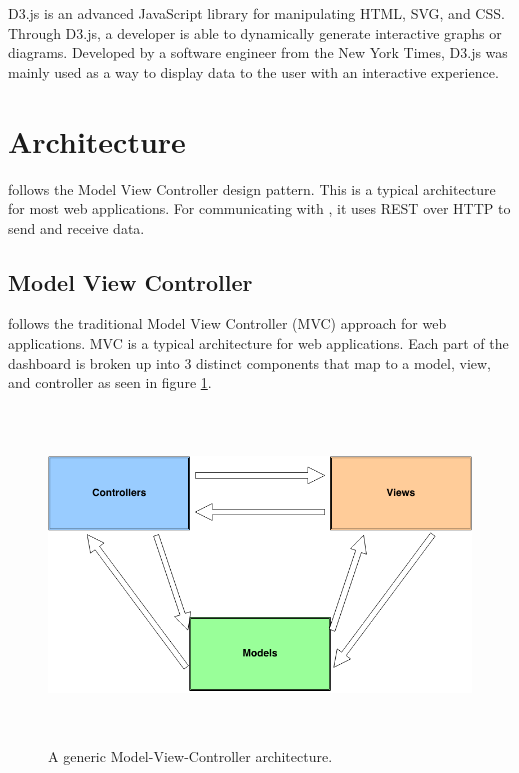D3.js\cite{Note:D3JS:2014} is an advanced JavaScript library for manipulating HTML, SVG, and CSS. Through D3.js, a developer is able to dynamically generate interactive graphs or diagrams. Developed by a software engineer from the New York Times, D3.js was mainly used as a way to display data to the user with an interactive experience.

\section{Architecture}
\label{makereference2.3}

\projectName{} follows the Model View Controller design pattern. This is a typical architecture for most web applications. For communicating with \ancor{}, it uses REST over HTTP to send and receive data.

\subsection{Model View Controller}

\projectName{} follows the traditional Model View Controller (MVC) approach for web applications. MVC is a typical architecture for web applications. Each part of the dashboard is broken up into 3 distinct components that map to a model, view, and controller as seen in figure \ref{mvc}.

\begin{figure}[htb]%

    \includegraphics[height=3.5in]{figures/mvc.png}

    \caption[Model-View-Controller Architecture
    ]{A generic Model-View-Controller architecture.}

    \label{mvc}
\end{figure}

